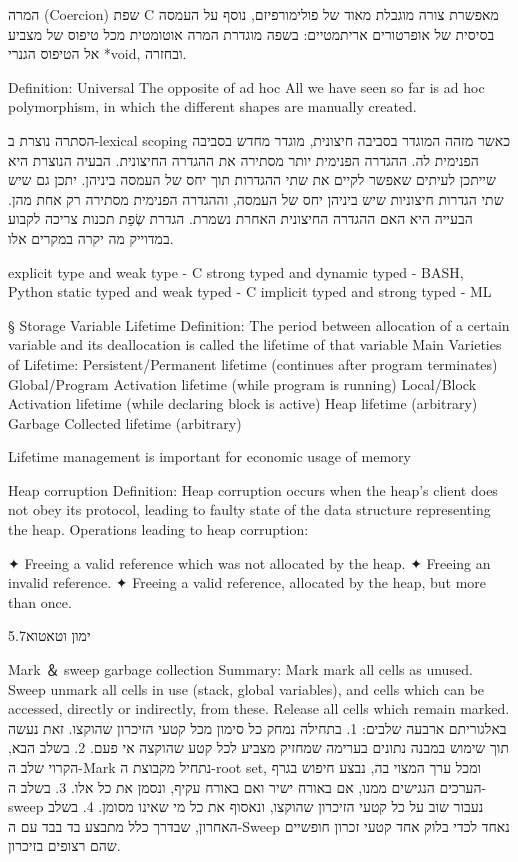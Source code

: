         המרה (Coercion)
        שפת C מאפשרת צורה מוגבלת מאוד של פולימורפיזם, נוסף על העמסה בסיסית של אופרטורים אריתמטיים: בשפה מוגדרת המרה אוטומטית מכל טיפוס של מצביע אל הטיפוס הגנרי *void, ובחזרה.

        Definition: Universal
        The opposite of ad hoc All we have seen so far is ad hoc polymorphism, in which the different shapes are manually created.

        הסתרה נוצרת ב-lexical scoping כאשר מזהה המוגדר בסביבה חיצונית, מוגדר מחדש בסביבה הפנימית לה. ההגדרה הפנימית יותר מסתירה את ההגדרה החיצונית. הבעיה הנוצרת היא שייתכן לעיתים שאפשר לקיים את שתי ההגדרות תוך יחס של העמסה ביניהן. יתכן גם שיש שתי הגדרות חיצוניות שיש ביניהן יחס של העמסה, וההגדרה הפנימית מסתירה רק אחת מהן. הבעייה היא האם ההגדרה החיצונית האחרת נשמרת. הגדרת שְׂפַת תכנות צריכה לקבוע במדוייק מה יקרה במקרים אלו.

        explicit type and weak type - C
        strong typed and dynamic typed - BASH, Python
        static typed and weak typed - C
        implicit typed and strong typed - ML

§ Storage
        Variable Lifetime
        Definition:
        The period between allocation of a certain variable and its deallocation is called the lifetime of that variable
        Main Varieties of Lifetime:
        Persistent/Permanent lifetime (continues after program terminates)
        Global/Program Activation lifetime (while program is running)
        Local/Block Activation lifetime (while declaring block is active)
        Heap lifetime (arbitrary)
        Garbage Collected lifetime (arbitrary)

        Lifetime management is important for economic usage of memory

        Heap corruption
        Definition:
        Heap corruption occurs when the heap’s client does not obey its protocol, leading to faulty state of the data structure representing the heap.
        Operations leading to heap corruption:
        \begin{ציינון}
          ✦ Freeing a valid reference which was not allocated by the heap.
          ✦ Freeing an invalid reference.
          ✦ Freeing a valid reference, allocated by the heap,
          but more than once.
        \end{ציינון}

        5.7ימון וטאטוא

        Mark ＆ sweep garbage collection
        Summary:
        Mark mark all cells as unused.
        Sweep unmark all cells in use (stack, global variables), and cells which can be accessed, directly or indirectly, from these.
        Release all cells which remain marked.
        באלגוריתם ארבעה שלבים:
        1. בתחילה נמחק כל סימון מכל קטעי הזיכרון שהוקצו. זאת נעשה תוך שימוש במבנה נתונים בערימה שמחזיק מצביע לכל קטע שהוקצה אי פעם.
        2. בשלב הבא, הקרוי שלב ה-Mark נתחיל מקבוצת ה-root set, ומכל ערך המצוי בה, נבצע חיפוש בגרף הערכים הנגישים ממנו, אם באורח ישיר ואם באורח עקיף, ונסמן את כל אלו.
        3. בשלב ה-sweep נעבור שוב על כל קטעי הזיכרון שהוקצו, ונאסוף את כל מי שאינו מסומן.
        4. בשלב האחרון, שבדרך כלל מתבצע בד בבד עם ה-Sweep נאחד לכדי בלוק אחד קטעי זכרון חופשיים שהם רצופים בזיכרון.

